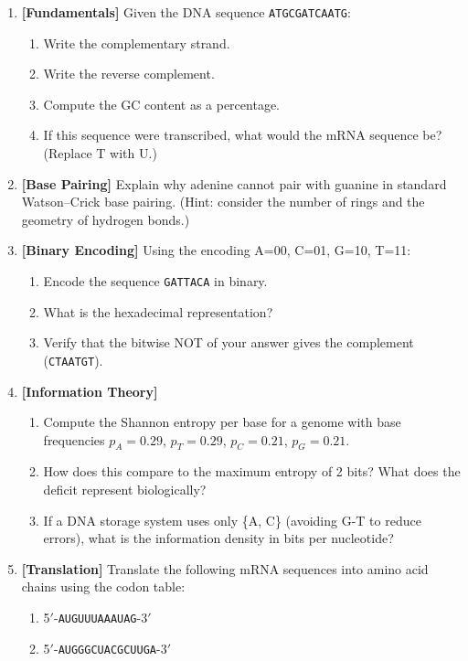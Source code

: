 \begin{enumerate}[label=\textbf{1.\arabic*.}, leftmargin=2.5em]

\item \textbf{[Fundamentals]} Given the DNA sequence \texttt{ATGCGATCAATG}:
  \begin{enumerate}[label=(\alph*)]
    \item Write the complementary strand.
    \item Write the reverse complement.
    \item Compute the GC content as a percentage.
    \item If this sequence were transcribed, what would the mRNA sequence be? (Replace T with U.)
  \end{enumerate}

\item \textbf{[Base Pairing]} Explain why adenine cannot pair with guanine in standard Watson--Crick base pairing. (Hint: consider the number of rings and the geometry of hydrogen bonds.)

\item \textbf{[Binary Encoding]} Using the encoding A=00, C=01, G=10, T=11:
  \begin{enumerate}[label=(\alph*)]
    \item Encode the sequence \texttt{GATTACA} in binary.
    \item What is the hexadecimal representation?
    \item Verify that the bitwise NOT of your answer gives the complement (\texttt{CTAATGT}).
  \end{enumerate}

\item \textbf{[Information Theory]}
  \begin{enumerate}[label=(\alph*)]
    \item Compute the Shannon entropy per base for a genome with base frequencies $p_A = 0.29$, $p_T = 0.29$, $p_C = 0.21$, $p_G = 0.21$.
    \item How does this compare to the maximum entropy of 2 bits? What does the deficit represent biologically?
    \item If a DNA storage system uses only \{A, C\} (avoiding G-T to reduce errors), what is the information density in bits per nucleotide?
  \end{enumerate}

\item \textbf{[Translation]} Translate the following mRNA sequences into amino acid chains using the codon table:
  \begin{enumerate}[label=(\alph*)]
    \item 5$'$-\texttt{AUGUUUAAAUAG}-3$'$
    \item 5$'$-\texttt{AUGGGCUACGCUUGA}-3$'$
  \end{enumerate}


\end{enumerate}
